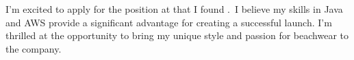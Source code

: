 



I'm excited to apply for the \position\;position at \company\;that I found \source.
\companynews\,I believe my skills in
Java and AWS provide a significant advantage for creating a successful launch. I'm thrilled at the opportunity to bring my unique style and passion for beachwear to the company.
